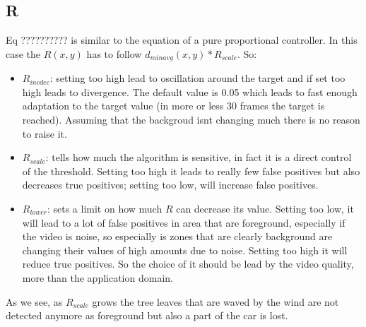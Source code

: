 \subsection*{R}
Eq ?????????? is similar to the equation of a pure proportional controller.
In this case the $R(x,y)$ has to follow $d_{minavg}(x,y) * R_{scale}$. So:
\begin{itemize}
    \item $R_{incdec}$: setting too high lead to oscillation around the target and if
    set too high leads to divergence. The default value is 0.05 which leads to fast
    enough adaptation to the target value (in more or less 30 frames the target is
    reached). Assuming that the backgroud isnt changing much there is no reason to
    raise it.
    \item $R_{scale}$: tells how much the algorithm is sensitive, in fact it is a direct
    control of the threshold. Setting too high it leads to really few false positives
    but also decreases true positives; setting too low, will increase false positives.
    \item $R_{lower}$: sets a limit on how much $R$ can decrease its value. Setting too
    low, it will lead to a lot of false positives in area that are foreground,
    especially if the video is noise, so especially is zones that are clearly
    background are changing their values of high amounts due to noise. Setting too
    high it will reduce true positives. So the choice of it should be lead by the
    video quality, more than the application domain.
\end{itemize}
\begin{figure}[!t]
    \centering
    \newline
    \newline
\end{figure}
As we see, as $R_{scale}$ grows the tree leaves that are waved by the wind are not detected
anymore as foreground but also a part of the car is lost.

